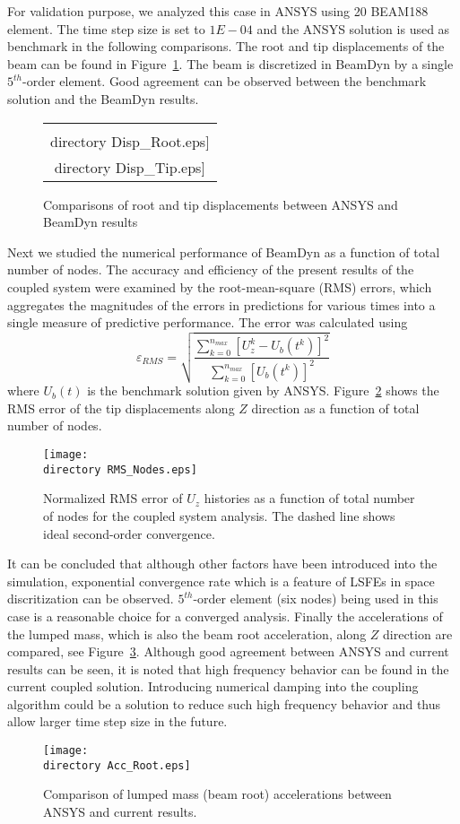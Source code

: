 \documentclass{aiaa-tc}
\def\directory{EPSF/}
\begin{document}
 For validation purpose, we analyzed this case in ANSYS using 20 BEAM188 element. The time step size is set to $1E-04$ and the ANSYS solution is used as benchmark in the following comparisons. The root and tip displacements of the beam can be found in Figure~\ref{fig:E1Disp}. The beam is discretized in BeamDyn by a single $5^{th}$-order element. Good agreement can be observed between the benchmark solution and the BeamDyn results.
 \begin{figure}
    \centering
    \begin{tabular}{c}
    \subfloat[Root Displacement]{\label{fig:E1DispRoot}\texttt{[image: \\directory  Disp\_Root.eps]}} \qquad
\subfloat[Tip Displacement]{\label{fig:E1DispTip}\texttt{[image: \\directory  Disp\_Tip.eps]}}\\
\end{tabular}
\caption{Comparisons of root and tip displacements between ANSYS and BeamDyn results}
\label{fig:E1Disp}
\end{figure} 
Next we studied the numerical performance of BeamDyn as a function of total number of nodes. The accuracy and efficiency of the present results of the coupled system were examined by the root-mean-square (RMS) errors, which aggregates the magnitudes of the errors in predictions for various times into a single measure of predictive performance. The error was calculated using
\begin{equation}
\varepsilon_{RMS}=\sqrt{\frac{\sum_{k=0}^{n_{max}}[U_z^k-U_b(t^k)]^2}{\sum_{k=0}^{n_{max}}[U_b(t^k)]^2}}
\label{RMSdefi}
\end{equation} 
where $U_b(t)$ is the benchmark solution given by ANSYS. Figure~\ref{fig:ConvNode} shows the RMS error of the tip displacements along $Z$ direction as a function of total number of nodes.
\begin{figure}
\centering
\texttt{[image: \\directory RMS\_Nodes.eps]}
\caption{Normalized RMS error of $U_z$ histories as a function of total number of nodes for the coupled system analysis. The dashed line shows ideal second-order convergence.} 
\label{fig:ConvNode}
\end{figure}
It can be concluded that although other factors have been introduced into the simulation, exponential convergence rate which is a feature of LSFEs in space discritization can be observed. $5^{th}$-order element (six nodes) being used in this case is a reasonable choice for a converged analysis. 
Finally the accelerations of the lumped mass, which is also the beam root acceleration, along $Z$ direction are compared, see Figure~\ref{fig:Acc}. Although good agreement between ANSYS and current results can be seen, it is noted that high frequency behavior can be found in the current coupled solution. Introducing numerical damping into the coupling algorithm could be a solution to reduce such high frequency behavior and thus allow larger time step size in the future.
\begin{figure}
\centering
\texttt{[image: \\directory Acc\_Root.eps]}
\caption{Comparison of lumped mass (beam root) accelerations between ANSYS and current results.} 
\label{fig:Acc}
\end{figure}
\end{document}
